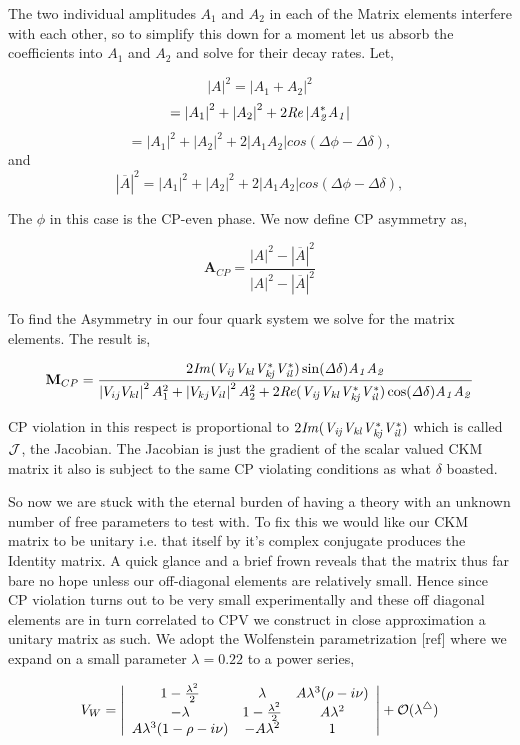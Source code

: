 The two individual amplitudes $A_1$ and $A_2$ in each of the Matrix elements interfere with each other, so to simplify this down for a moment let us absorb the coefficients into $A_1$ and $A_2$ and solve for their decay rates. 
Let,

\[ \left|A\right|^2 = \left| A_1 +A_2 \right|^2\]
\[=\left|  A_1 \right|^2+ \left| A_2 \right|^2 +2\it{R} e\left| A^*_2 A_1 \right| \]
\[=\left| A_1 \right|^2 + \left| A_2 \right|^2 +2\left|A_1 A_2 \right| cos(\Delta \phi - \Delta\delta),\] and
\[\left| \overline{A}\right|^2 =\left| A_1 \right|^2+ \left| A_2 \right|^2 +2\left| A_1 A_2 \right| cos(\Delta \phi - \Delta\delta),\]

The $\phi$ in this case is the CP-even phase. We now define CP asymmetry as,

\[\mathbf{A}_{CP} = \frac{\left|A\right|^2-\left|\overline{A}\right|^2}{\left|A\right|^2-\left|\overline{A}\right|^2}\]

To find the Asymmetry in our four quark system we solve for the matrix elements. The result is,

\[ \mathbf{M}_{CP}= \frac{ 2\it{I}m (V_{ij} V_{kl} V^{*}_{kj }V^{*}_{il} )\sin(\Delta\delta) A_{1} A_{2}}{\left| V_{ij} V_{kl}\right|^2 A^{2}_{1} + \left|V_{kj}V_{il}\right|^2 A^{2}_{2} +2 \it{R} e (V_{ij} V_{kl} V^{*}_{kj} V^{*}_{il} ) \cos(\Delta\delta)A_1 A_2} \]

CP violation in this respect is proportional to $2\it{I}m(V_{ij}V_{kl}V^{*}_{kj}V^{*}_{il})$ which is called $\cal{J}$, the Jacobian. The Jacobian is just the gradient of the scalar valued CKM matrix it also is subject to the same CP violating conditions as what $\delta$ boasted.

So now we are stuck with the eternal burden of having a theory with an unknown number of free parameters to test with. To fix this we would like our CKM matrix to be unitary i.e. that itself by it's complex conjugate produces the Identity matrix. A quick glance and a brief frown reveals that the matrix thus far bare no hope unless our off-diagonal elements are relatively small. Hence since CP violation turns out to be very small experimentally and these off diagonal elements are in turn correlated to CPV we construct in close approximation a unitary matrix as such. We adopt the Wolfenstein parametrization [ref] where we expand on a small parameter $\lambda = 0.22$ to a power series,

\[ V_{W} =\left| \begin{array}{ccc} 1-\frac{\lambda^2}{2} & \lambda & A\lambda^3(\rho-i\nu) \\ -\lambda & 1-\frac{\lambda^2}{2} & A\lambda^2 \\ A\lambda^3(1-\rho-i\nu) &  -A\lambda^2 & 1 \end{array}\right| + \cal{O}(\lambda^4)\]

